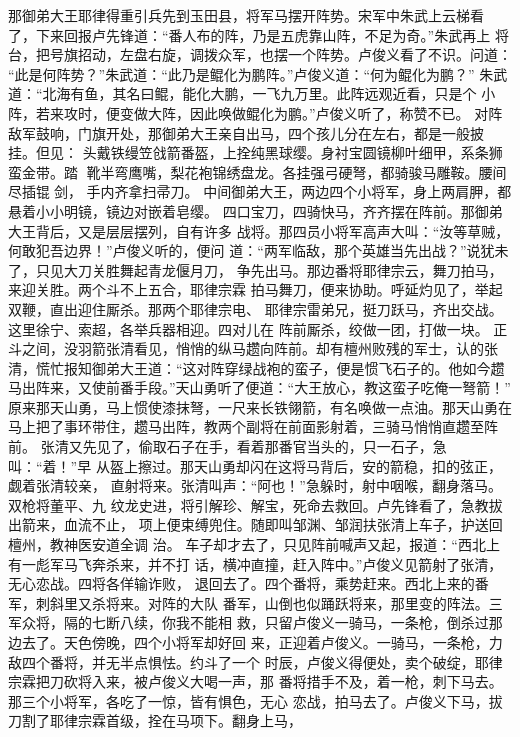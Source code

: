 那御弟大王耶律得重引兵先到玉田县，将军马摆开阵势。宋军中朱武上云梯看
了，下来回报卢先锋道：“番人布的阵，乃是五虎靠山阵，不足为奇。”朱武再上
将台，把号旗招动，左盘右旋，调拨众军，也摆一个阵势。卢俊义看了不识。问道：
“此是何阵势？”朱武道：“此乃是鲲化为鹏阵。”卢俊义道：“何为鲲化为鹏？”
朱武道：“北海有鱼，其名曰鲲，能化大鹏，一飞九万里。此阵远观近看，只是个
小阵，若来攻时，便变做大阵，因此唤做鲲化为鹏。”卢俊义听了，称赞不已。
对阵敌军鼓响，门旗开处，那御弟大王亲自出马，四个孩儿分在左右，都是一般披
挂。但见：
头戴铁缦笠戗箭番盔，上拴纯黑球缨。身衬宝圆镜柳叶细甲，系条狮蛮金带。踏
靴半弯鹰嘴，梨花袍锦绣盘龙。各挂强弓硬弩，都骑骏马雕鞍。腰间尽插锟剑，
手内齐拿扫帚刀。
中间御弟大王，两边四个小将军，身上两肩胛，都悬着小小明镜，镜边对嵌着皂缨。
四口宝刀，四骑快马，齐齐摆在阵前。那御弟大王背后，又是层层摆列，自有许多
战将。那四员小将军高声大叫：“汝等草贼，何敢犯吾边界！”卢俊义听的，便问
道：“两军临敌，那个英雄当先出战？”说犹未了，只见大刀关胜舞起青龙偃月刀，
争先出马。那边番将耶律宗云，舞刀拍马，来迎关胜。两个斗不上五合，耶律宗霖
拍马舞刀，便来协助。呼延灼见了，举起双鞭，直出迎住厮杀。那两个耶律宗电、
耶律宗雷弟兄，挺刀跃马，齐出交战。这里徐宁、索超，各举兵器相迎。四对儿在
阵前厮杀，绞做一团，打做一块。
正斗之间，没羽箭张清看见，悄悄的纵马趱向阵前。却有檀州败残的军士，认的张
清，慌忙报知御弟大王道：“这对阵穿绿战袍的蛮子，便是惯飞石子的。他如今趱
马出阵来，又使前番手段。”天山勇听了便道：“大王放心，教这蛮子吃俺一弩箭！”
原来那天山勇，马上惯使漆抹弩，一尺来长铁翎箭，有名唤做一点油。那天山勇在
马上把了事环带住，趱马出阵，教两个副将在前面影射着，三骑马悄悄直趱至阵前。
张清又先见了，偷取石子在手，看着那番官当头的，只一石子，急叫：“着！”早
从盔上擦过。那天山勇却闪在这将马背后，安的箭稳，扣的弦正，觑着张清较亲，
直射将来。张清叫声：“阿也！”急躲时，射中咽喉，翻身落马。双枪将董平、九
纹龙史进，将引解珍、解宝，死命去救回。卢先锋看了，急教拔出箭来，血流不止，
项上便束缚兜住。随即叫邹渊、邹润扶张清上车子，护送回檀州，教神医安道全调
治。
车子却才去了，只见阵前喊声又起，报道：“西北上有一彪军马飞奔杀来，并不打
话，横冲直撞，赶入阵中。”卢俊义见箭射了张清，无心恋战。四将各佯输诈败，
退回去了。四个番将，乘势赶来。西北上来的番军，刺斜里又杀将来。对阵的大队
番军，山倒也似踊跃将来，那里变的阵法。三军众将，隔的七断八续，你我不能相
救，只留卢俊义一骑马，一条枪，倒杀过那边去了。天色傍晚，四个小将军却好回
来，正迎着卢俊义。一骑马，一条枪，力敌四个番将，并无半点惧怯。约斗了一个
时辰，卢俊义得便处，卖个破绽，耶律宗霖把刀砍将入来，被卢俊义大喝一声，那
番将措手不及，着一枪，刺下马去。那三个小将军，各吃了一惊，皆有惧色，无心
恋战，拍马去了。卢俊义下马，拔刀割了耶律宗霖首级，拴在马项下。翻身上马，
